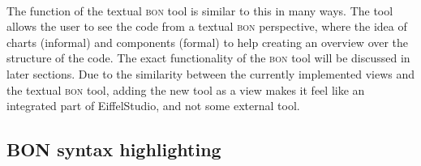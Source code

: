 \paragraph{}
The function of the textual \textsc{bon} tool is similar to this in many ways. The tool allows the user to see the code from a textual \textsc{bon} perspective, where the idea of charts (informal) and components (formal) to help creating an overview over the structure of the code. The exact functionality of the \textsc{bon} tool will be discussed in later sections. Due to the similarity between the currently implemented views and the textual \textsc{bon} tool, adding the new tool as a view makes it feel like an integrated part of EiffelStudio, and not some external tool.

\subsection{BON syntax highlighting}